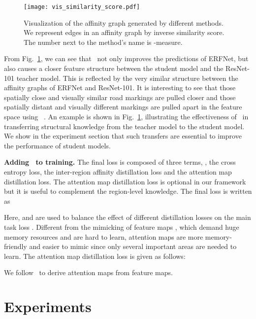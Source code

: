 \documentclass[10pt,twocolumn,letterpaper]{article}
\begin{document}
\begin{figure}[t]
  \centering
  \texttt{[image: vis\_similarity\_score.pdf]}
  \vskip -0.2cm
  \caption{Visualization of the affinity graph generated by different methods. We represent edges in an affinity graph by inverse similarity score. The number next to the method's name is -measure.}
  \centering
  \vskip -0.6cm
  \label{fig:score}
\end{figure}

From Fig.~\ref{fig:score}, we can see that \algorithmname~not only improves the predictions of ERFNet, but also causes a closer feature structure between the student model and the ResNet-101 teacher model. This is reflected by the very similar structure between the affinity graphs of ERFNet and ResNet-101.
It is interesting to see that those spatially close and visually similar road markings are pulled closer and those spatially distant and visually different markings are pulled apart in the feature space using \algorithmname~. An example is shown in Fig.~\ref{fig:score}, illustrating the effectiveness of \algorithmname~in transferring structural knowledge from the teacher model to the student model. We show in the experiment section that such transfers are essential to improve the performance of student models. 



\noindent \textbf{Adding \algorithmname~to training.} The final loss is composed of three terms, \ie, the cross entropy loss, the inter-region affinity distillation loss and the attention map distillation loss. The attention map distillation loss is optional in our framework but it is useful to complement the region-level knowledge. The final loss is written as


\noindent Here,  and  are used to balance the effect of different distillation losses on the main task loss . Different from the mimicking of feature maps , which demand huge memory resources and are hard to learn, attention maps  are more memory-friendly and easier to mimic since only several important areas are needed to learn. The attention map distillation loss is given as follows:

\noindent We follow~\cite{zagoruyko2016paying} to derive attention maps from feature maps.

 
\section{Experiments}
\label{sec:experiments}
\end{document}
